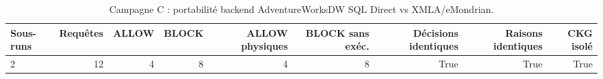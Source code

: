 \begin{table}[!t]
\centering
\caption{Campagne C : portabilité backend AdventureWorksDW SQL Direct vs XMLA/eMondrian.}
\scriptsize
\setlength{\tabcolsep}{4pt}
\begin{tabular}{@{}lrrrrrrrr@{}}
\toprule
Sous-runs & Requêtes & ALLOW & BLOCK & ALLOW physiques & BLOCK sans exéc. & Décisions identiques & Raisons identiques & CKG isolé \\
\midrule
2 & 12 & 4 & 8 & 4 & 8 & True & True & True \\
\bottomrule
\end{tabular}
\normalsize
\label{tab:campaign-c-portability}
\end{table}
